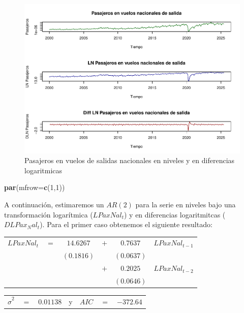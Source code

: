 \documentclass[
]{book}
\newenvironment{Shaded}{\begin{snugshade}}{\end{snugshade}}
\newcommand{\AttributeTok}[1]{\textcolor[rgb]{0.13,0.29,0.53}{#1}}
\newcommand{\DecValTok}[1]{\textcolor[rgb]{0.00,0.00,0.81}{#1}}
\newcommand{\FunctionTok}[1]{\textcolor[rgb]{0.13,0.29,0.53}{\textbf{#1}}}
\newcommand{\NormalTok}[1]{#1}
\begin{document}
\begin{figure}

{\centering \includegraphics{Notas-Series-Tiempo_files/figure-latex/fig47-1} 

}

\caption{Pasajeros en vuelos de salidas nacionales en niveles y en diferencias logaritmicas}\label{fig:fig47}
\end{figure}

\begin{Shaded}
\begin{Highlighting}[]
\FunctionTok{par}\NormalTok{(}\AttributeTok{mfrow=}\FunctionTok{c}\NormalTok{(}\DecValTok{1}\NormalTok{,}\DecValTok{1}\NormalTok{))}
\end{Highlighting}
\end{Shaded}

A continuación, estimaremos un \(AR(2)\) para la serie en niveles bajo una transformación logarítmica (\(LPaxNal_t\)) y en diferencias logaritmitcas (\(DLPax_Nal_t\)). Para el primer caso obtenemos el siguiente resultado:

\begin{center}
\begin{tabular}{ c c c c c c } 
    $LPaxNal_t$ & $=$ & $14.6267$ & $+$ & $0.7637$  & $LPaxNal_{t-1}$ \\ 
    &  & $(0.1816)$ &  & $(0.0637)$ & \\
    &  &  & $+$ & $0.2025$ & $LPaxNal_{t-2}$ \\
    &  &  &  & $(0.0646)$ &
\end{tabular}
\end{center}

\begin{center}
\begin{tabular}{ c c c c c c c } 
    $\hat{\sigma}^2$ & $=$ & $0.01138$ & y & $AIC$ & $=$ & $-372.64$ 
\end{tabular}
\end{center}
\end{document}
